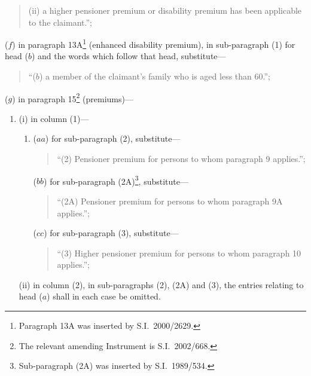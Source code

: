 \documentclass[12pt,a4paper]{article}
\begin{document}
\begin{enumerate}
\begin{quotation}
\begin{enumerate}
(ii) a higher pensioner premium or disability premium has been applicable to the claimant.”;
\end{enumerate}
\end{quotation}

($f$) in paragraph 13A\footnote{Paragraph 13A was inserted by S.I.\ 2000/2629.} (enhanced disability premium), in sub-paragraph (1) for head ($b$)  and the words which follow that head, substitute—
\begin{quotation}
“($b$) a member of the claimant’s family who is aged less than 60.”;
\end{quotation}

($g$) in paragraph 15\footnote{The relevant amending Instrument is S.I.\ 2002/668.} (premiums)—
\begin{enumerate}\item[]
(i) in column (1)—
\begin{enumerate}\item[]
($aa$) for sub-paragraph (2), substitute—
\begin{quotation}
“(2) Pensioner premium for persons to whom paragraph 9 applies.”;
\end{quotation}

($bb$) for sub-paragraph (2A)\footnote{Sub-paragraph (2A) was inserted by S.I.\ 1989/534.}, substitute—
\begin{quotation}
“(2A) Pensioner premium for persons to whom paragraph 9A applies.”;
\end{quotation}

($cc$) for sub-paragraph (3), substitute—
\begin{quotation}
“(3) Higher pensioner premium for persons to whom paragraph 10 applies.”;
\end{quotation}
\end{enumerate}

(ii) in column (2), in sub-paragraphs (2), (2A) and (3), the entries relating to head ($a$)  shall in each case be omitted.
\end{enumerate}
\end{enumerate}
\end{document}
